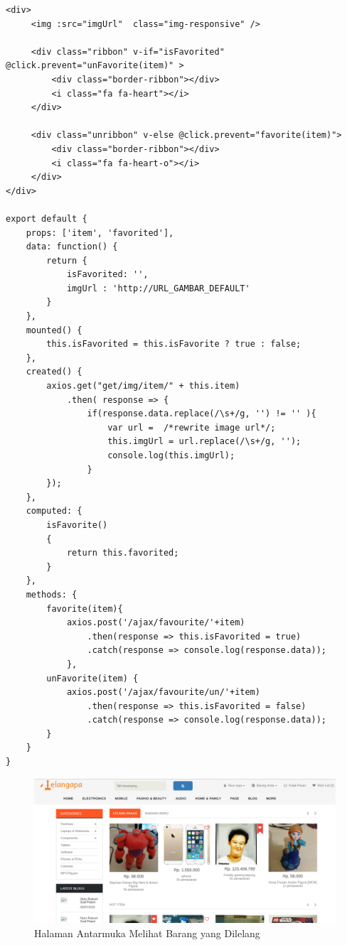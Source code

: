 \begin{lstlisting}[label=cdv.02-01,style=htmlcssjs,caption=Implementasi Vue Melihat Daftar Barang]
<div>
	 <img :src="imgUrl"  class="img-responsive" />
	 
	 <div class="ribbon" v-if="isFavorited" @click.prevent="unFavorite(item)" >
		 <div class="border-ribbon"></div>
		 <i class="fa fa-heart"></i>
	 </div>
	 
	 <div class="unribbon" v-else @click.prevent="favorite(item)">
		 <div class="border-ribbon"></div>
		 <i class="fa fa-heart-o"></i>
	 </div>
</div>

export default {
    props: ['item', 'favorited'],
    data: function() {
        return {
            isFavorited: '',
            imgUrl : 'http://URL_GAMBAR_DEFAULT'
        }
    },
    mounted() {
        this.isFavorited = this.isFavorite ? true : false;
    },
    created() {
        axios.get("get/img/item/" + this.item)
            .then( response => {
	            if(response.data.replace(/\s+/g, '') != '' ){
	            	var url =  /*rewrite image url*/;
	            	this.imgUrl = url.replace(/\s+/g, '');
	            	console.log(this.imgUrl);
	        	}
    	});
    },
    computed: {
        isFavorite()
        {
            return this.favorited;
        }
    },
    methods: {
        favorite(item){
            axios.post('/ajax/favourite/'+item)
                .then(response => this.isFavorited = true)
        		.catch(response => console.log(response.data));
        	},
        unFavorite(item) {
            axios.post('/ajax/favourite/un/'+item)
                .then(response => this.isFavorited = false)
        		.catch(response => console.log(response.data));
        }
    }
}
\end{lstlisting}

\begin{figure}[H]
	\centering
	\includegraphics[width=\textwidth]{images/bab4/ui/02-01.png}
	\caption{Halaman Antarmuka Melihat Barang yang Dilelang }
	\label{ui.02-01}
\end{figure}

